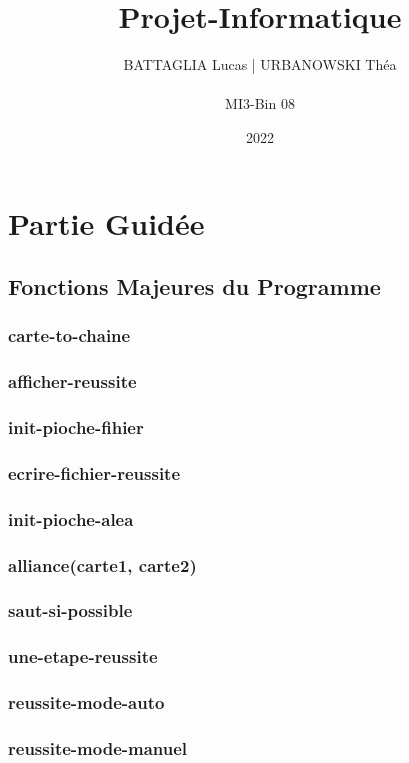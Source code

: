 \documentclass{article}
\title{\huge \textbf{Projet-Informatique}}
\author{BATTAGLIA Lucas | URBANOWSKI Théa \\ \\ MI3-Bin 08}
\date{2022}
\begin{document}
\maketitle
\tableofcontents
\newpage


\section{Partie Guidée}

    \subsection{Fonctions Majeures du Programme}
        \subsubsection{\ttfamily carte-to-chaine}
        \subsubsection{\ttfamily afficher-reussite}
        \subsubsection{\ttfamily init-pioche-fihier}
        \subsubsection{\ttfamily ecrire-fichier-reussite}
        \subsubsection{\ttfamily init-pioche-alea}
        \subsubsection{\ttfamily alliance(carte1, carte2)}
        \subsubsection{\ttfamily saut-si-possible}
        \subsubsection{\ttfamily une-etape-reussite}
        \subsubsection{\ttfamily reussite-mode-auto}
        \subsubsection{\ttfamily reussite-mode-manuel}
\end{document}
